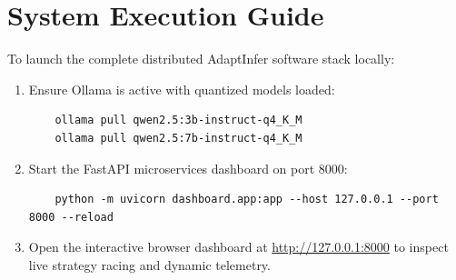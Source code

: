 \documentclass[12pt,a4paper]{report}
\begin{document}
\section{System Execution Guide}
\label{sec:execution_guide}
To launch the complete distributed AdaptInfer software stack locally:
\begin{enumerate}[leftmargin=*]
    \item Ensure Ollama is active with quantized models loaded:
    \begin{verbatim}
    ollama pull qwen2.5:3b-instruct-q4_K_M
    ollama pull qwen2.5:7b-instruct-q4_K_M
    \end{verbatim}
    \item Start the FastAPI microservices dashboard on port 8000:
    \begin{verbatim}
    python -m uvicorn dashboard.app:app --host 127.0.0.1 --port 8000 --reload
    \end{verbatim}
    \item Open the interactive browser dashboard at \url{http://127.0.0.1:8000} to inspect live strategy racing and dynamic telemetry.
\end{enumerate}
\end{document}
